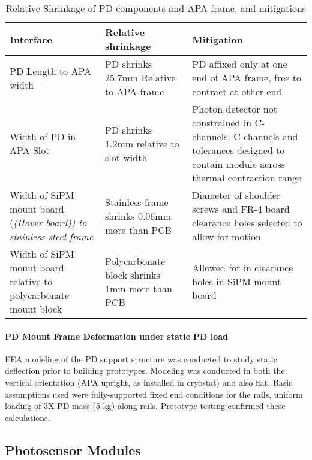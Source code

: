
\begin{table}[h!]
\label{tbl:fdsfpdshrinkeffects}
\begin{center}
\caption{Relative Shrinkage of PD components and APA frame, and mitigations}
\begin{tabular}{|p{}|p{}|p{}}
\hline
\textbf{Interface} & \textbf{Relative shrinkage} & \textbf{Mitigation} \\
\hline
PD Length to APA width & PD shrinks 25.7mm Relative to APA frame & PD affixed only at one end of APA frame, free to contract at other end \\
\hline
Width of PD in APA Slot & PD shrinks 1.2mm relative to slot width & Photon detector not constrained in C-channels. C channels and tolerances designed to contain module across thermal contraction range \\
\hline
Width of SiPM mount board (\it(Hover board)) to stainless steel frame & Stainless frame shrinks 0.06mm more than PCB & Diameter of shoulder screws and FR-4 board clearance holes selected to allow for motion \\
\hline
Width of SiPM mount board relative to polycarbonate mount block & Polycarbonate block shrinks 1mm more than PCB & Allowed for in clearance holes in SiPM mount board \\
\hline
\end{tabular}
\end{center}
\end{table}


\paragraph{PD Mount Frame Deformation under static PD load}

FEA modeling of the PD support structure was conducted to study static deflection 
prior to building prototypes.  Modeling was conducted in both the vertical
 orientation (APA upright, as installed in cryostat) and also flat.  
Basic assumptions used were fully-supported fixed end conditions for the rails, 
uniform loading of 3X PD mass (5 kg) along rails.  
Prototype testing confirmed these calculations.




\subsection{Photosensor Modules}
\label{sec:fdsp-pd-assy-psm}

